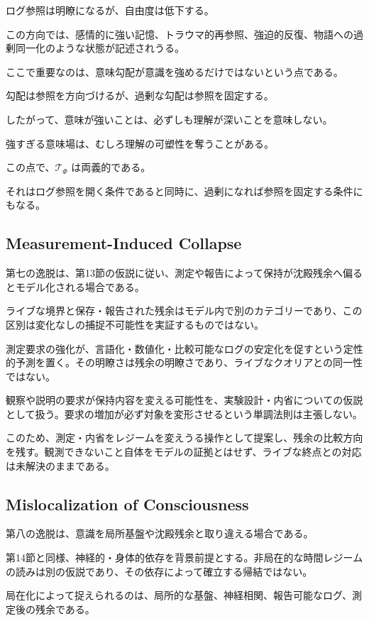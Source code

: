 ログ参照は明瞭になるが、自由度は低下する。

この方向では、感情的に強い記憶、トラウマ的再参照、強迫的反復、物語への過剰同一化のような状態が記述されうる。

ここで重要なのは、意味勾配が意識を強めるだけではないという点である。

勾配は参照を方向づけるが、過剰な勾配は参照を固定する。

したがって、意味が強いことは、必ずしも理解が深いことを意味しない。

強すぎる意味場は、むしろ理解の可塑性を奪うことがある。

この点で、$\mathcal{T}_{\Phi}$ は両義的である。

それはログ参照を開く条件であると同時に、過剰になれば参照を固定する条件にもなる。

\subsection{Measurement-Induced Collapse}

第七の逸脱は、第13節の仮説に従い、測定や報告によって保持が沈殿残余へ偏るとモデル化される場合である。

ライブな境界と保存・報告された残余はモデル内で別のカテゴリーであり、この区別は変化なしの捕捉不可能性を実証するものではない。

測定要求の強化が、言語化・数値化・比較可能なログの安定化を促すという定性的予測を置く。その明瞭さは残余の明瞭さであり、ライブなクオリアとの同一性ではない。

観察や説明の要求が保持内容を変える可能性を、実験設計・内省についての仮説として扱う。要求の増加が必ず対象を変形させるという単調法則は主張しない。

このため、測定・内省をレジームを変えうる操作として提案し、残余の比較方向を残す。観測できないこと自体をモデルの証拠とはせず、ライブな終点との対応は未解決のままである。

\subsection{Mislocalization of Consciousness}

第八の逸脱は、意識を局所基盤や沈殿残余と取り違える場合である。

第14節と同様、神経的・身体的依存を背景前提とする。非局在的な時間レジームの読みは別の仮説であり、その依存によって確立する帰結ではない。

局在化によって捉えられるのは、局所的な基盤、神経相関、報告可能なログ、測定後の残余である。

